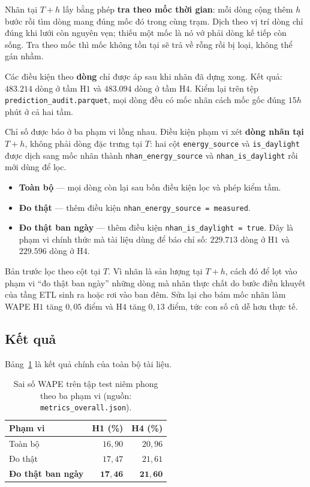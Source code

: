 Nhãn tại $T{+}h$ lấy bằng phép \textbf{tra theo mốc thời gian}: mỗi dòng cộng thêm $h$ bước rồi
tìm dòng mang đúng mốc đó trong cùng trạm. Dịch theo vị trí dòng chỉ đúng khi lưới còn nguyên
vẹn; thiếu một mốc là nó vớ phải dòng kế tiếp còn sống. Tra theo mốc thì mốc không tồn tại sẽ
trả về rỗng rồi bị loại, không thể gán nhầm.

Các điều kiện theo \textbf{dòng} chỉ được áp sau khi nhãn đã dựng xong. Kết quả:
$\mathbf{483.214}$ dòng ở tầm H$1$ và $\mathbf{483.094}$ dòng ở tầm H$4$. Kiểm lại trên tệp
\texttt{prediction\_audit.parquet}, mọi dòng đều có mốc nhãn cách mốc gốc đúng $15h$ phút ở cả
hai tầm.

Chỉ số được báo ở ba phạm vi lồng nhau. Điều kiện phạm vi xét \textbf{dòng nhãn tại $T{+}h$},
không phải dòng đặc trưng tại $T$: hai cột \texttt{energy\_source} và \texttt{is\_daylight} được dịch
sang mốc nhãn thành \texttt{nhan\_energy\_source} và \texttt{nhan\_is\_daylight} rồi mới dùng để lọc.

\begin{itemize}
    \item \textbf{Toàn bộ} --- mọi dòng còn lại sau bốn điều kiện lọc và phép kiểm tầm.
    \item \textbf{Đo thật} --- thêm điều kiện \texttt{nhan\_energy\_source = measured}.
    \item \textbf{Đo thật ban ngày} --- thêm điều kiện \texttt{nhan\_is\_daylight = true}. Đây là
    phạm vi chính thức mà tài liệu dùng để báo chỉ số: $229.713$ dòng ở H$1$ và $229.596$ dòng
    ở H$4$.
\end{itemize}

Bản trước lọc theo cột tại $T$. Vì nhãn là sản lượng tại $T{+}h$, cách đó để lọt vào phạm vi
``đo thật ban ngày'' những dòng mà nhãn thực chất do bước điền khuyết của tầng ETL sinh ra hoặc
rơi vào ban đêm. Sửa lại cho bám mốc nhãn làm WAPE H$1$ tăng $0{,}05$ điểm và H$4$ tăng
$0{,}13$ điểm, tức con số cũ dễ hơn thực tế.

\FloatBarrier
\subsection{Kết quả}

Bảng~\ref{tab:ket_qua_test} là kết quả chính của toàn bộ tài liệu.

\begin{table}[htbp]
\centering
\caption{Sai số WAPE trên tập test niêm phong theo ba phạm vi (nguồn: \texttt{metrics\_overall.json}).}
\label{tab:ket_qua_test}
\small
\begin{tabular}{l r r}
\toprule
\textbf{Phạm vi} & \textbf{H1 (\%)} & \textbf{H4 (\%)} \\
\midrule
Toàn bộ                   & $16{,}90$ & $20{,}96$ \\
Đo thật                   & $17{,}47$ & $21{,}61$ \\
\textbf{Đo thật ban ngày} & $\mathbf{17{,}46}$ & $\mathbf{21{,}60}$ \\
\bottomrule
\end{tabular}
\end{table}

